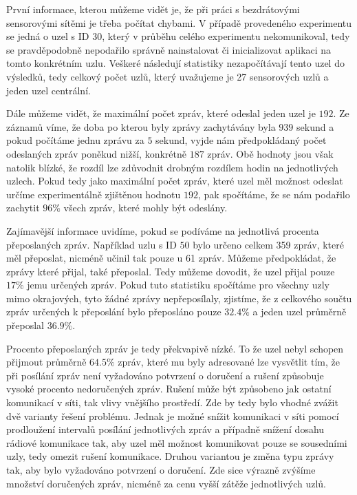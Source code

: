 \documentclass[11pt,final,twoside]{fithesis2}
\begin{document}
První informace, kterou můžeme vidět je, že při práci s bezdrátovými sensorovými sítěmi je třeba počítat chybami. V případě provedeného experimentu se jedná o uzel s ID 30, který v průběhu celého experimentu 
nekomunikoval, tedy se pravděpodobně nepodařilo správně nainstalovat či inicializovat aplikaci na tomto konkrétním uzlu. Veškeré následují statistiky nezapočítávají tento uzel do výsledků, tedy celkový počet 
uzlů, který uvažujeme je 27 sensorových uzlů a jeden uzel centrální. 

Dále můžeme vidět, že maximální počet zpráv, které odeslal jeden uzel je $192$. Ze záznamů víme, že doba po kterou byly zprávy zachytávány  byla $939$ sekund a pokud počítáme jednu 
zprávu za $5$ sekund, vyjde nám předpokládaný počet odeslaných zpráv poněkud nižší, konkrétně $187$ zpráv. Obě hodnoty jsou však natolik blízké, že rozdíl lze zdůvodnit drobným rozdílem hodin na jednotlivých 
uzlech. Pokud tedy jako maximální počet zpráv, které uzel měl možnost odeslat určíme experimentálně zjištěnou hodnotu $192$, pak spočítáme, že se nám podařilo zachytit $96\%$ všech zpráv, 
které mohly být odeslány.

Zajímavější informace uvidíme, pokud se podíváme na jednotlivá procenta přeposlaných zpráv. Například uzlu s ID $50$ bylo určeno celkem 359 zpráv, které měl přeposlat, nicméně učinil tak pouze u 61 zpráv. 
Můžeme předpokládat, že zprávy které přijal, také přeposlal. Tedy můžeme dovodit, že uzel přijal pouze $17\%$ jemu určených zpráv. Pokud tuto statistiku spočítáme pro všechny uzly mimo okrajových, tyto žádné 
zprávy nepřeposílaly, zjistíme, že z celkového součtu zpráv určených k přeposlání bylo přeposláno pouze $32.4\%$ a jeden uzel průměrně přeposlal $36.9\%$. 

Procento přeposlaných zpráv je tedy překvapivě nízké. To že uzel nebyl schopen přijmout průměrně $64.5\%$ zpráv, které mu byly adresované lze vysvětlit tím, že při posílání zpráv není vyžadováno potvrzení o 
doručení a rušení způsobuje vysoké procento nedoručených zpráv. Rušení může být způsobeno jak ostatní komunikací v síti, tak vlivy vnějšího prostředí. Zde by tedy bylo vhodné zvážit dvě varianty řešení 
problému. Jednak je možné snížit komunikaci v síti pomocí prodloužení intervalů posílání jednotlivých zpráv a případně snížení dosahu rádiové komunikace tak, aby uzel měl možnost komunikovat pouze se 
sousedními uzly, tedy omezit rušení komunikace. Druhou variantou je změna typu zprávy tak, aby bylo vyžadováno potvrzení o doručení. Zde sice výrazně zvýšíme množství doručených zpráv, nicméně za cenu vyšší zátěže jednotlivých uzlů.
\end{document}
